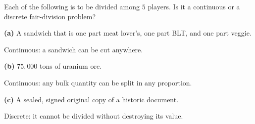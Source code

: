 \documentclass[12pt]{ximera}
\begin{document}
\begin{problem}
Each of the following is to be divided among $5$ players. Is it a continuous or a
discrete fair-division problem?

\begin{prompt}
\textbf{(a)} A sandwich that is one part meat lover's, one part BLT, and one part veggie.
\begin{multipleChoice}
\end{multipleChoice}
\begin{feedback}
Continuous: a sandwich can be cut anywhere.
\end{feedback}
\end{prompt}
\begin{prompt}
\textbf{(b)} $75{,}000$ tons of uranium ore.
\begin{multipleChoice}
\end{multipleChoice}
\begin{feedback}
Continuous: any bulk quantity can be split in any proportion.
\end{feedback}
\end{prompt}
\begin{prompt}
\textbf{(c)} A sealed, signed original copy of a historic document.
\begin{multipleChoice}
\end{multipleChoice}
\begin{feedback}
Discrete: it cannot be divided without destroying its value.
\end{feedback}
\end{prompt}
\end{problem}
\end{document}
